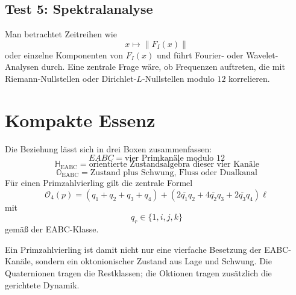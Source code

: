 \documentclass[11pt,a4paper]{article}
\theoremstyle{definition}
\theoremstyle{plain}
\newcommand{\HH}{\mathbb{H}}
\newcommand{\OO}{\mathbb{O}}
\newcommand{\EABC}{\mathrm{EABC}}
\newcommand{\norm}[1]{\left\lVert #1 \right\rVert}
\newcommand{\conj}[1]{\overline{#1}}
\begin{document}
	\subsection{Test 5: Spektralanalyse}
	Man betrachtet Zeitreihen wie
	\[
	x\mapsto \norm{F_I(x)}
	\]
	oder einzelne Komponenten von $F_I(x)$ und führt Fourier- oder Wavelet-Analysen durch. Eine zentrale Frage wäre, ob Frequenzen auftreten, die mit Riemann-Nullstellen oder Dirichlet-$L$-Nullstellen modulo $12$ korrelieren.
	
	\section{Kompakte Essenz}
	
	Die Beziehung lässt sich in drei Boxen zusammenfassen:
	\[
	\boxed{
		EABC
		=
		\text{vier Primkanäle modulo }12
	}
	\]
	\[
	\boxed{
		\HH_{\EABC}
		=
		\text{orientierte Zustandsalgebra dieser vier Kanäle}
	}
	\]
	\[
	\boxed{
		\OO_{\EABC}
		=
		\text{Zustand plus Schwung, Fluss oder Dualkanal}
	}
	\]
	Für einen Primzahlvierling gilt die zentrale Formel
	\[
	\boxed{
		\mathcal O_4(p)
		=
		(q_1+q_2+q_3+q_4)
		+
		\left(
		2\conj{q_1}q_2
		+4\conj{q_2}q_3
		+2\conj{q_3}q_4
		\right)\ell
	}
	\]
	mit
	\[
	q_r\in\{1,i,j,k\}
	\]
	gemäß der EABC-Klasse.
	
	Ein Primzahlvierling ist damit nicht nur eine vierfache Besetzung der EABC-Kanäle, sondern ein oktonionischer Zustand aus Lage und Schwung. Die Quaternionen tragen die Restklassen; die Oktionen tragen zusätzlich die gerichtete Dynamik.
	
\end{document}
